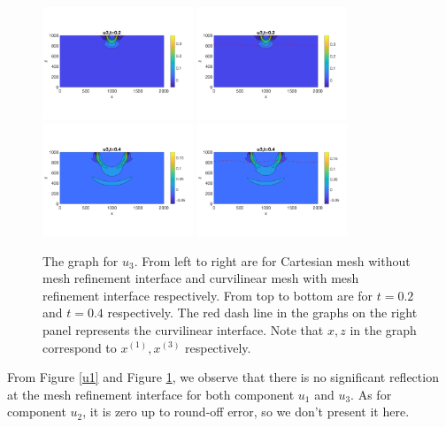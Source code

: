 
\begin{figure}[htbp]
	\centering
	\includegraphics[width=0.4\textwidth,trim={0 2.8cm 0 2.8cm}, clip]{u3_t02_cartesian.png}
	\includegraphics[width=0.4\textwidth,trim={0 2.8cm 0 2.8cm}, clip]{u3_t02_curvi_mr.png}\\
	\includegraphics[width=0.4\textwidth,trim={0 2.8cm 0 2.8cm}, clip]{u3_t04_cartesian.png}
	\includegraphics[width=0.4\textwidth,trim={0 2.8cm 0 2.8cm}, clip]{u3_t04_curvi_mr.png}
	\caption{The graph for $u_3$. From left to right are for Cartesian mesh without mesh refinement interface and curvilinear mesh with mesh refinement interface respectively. From top to bottom are for $t = 0.2$ and $t = 0.4$ respectively. The red dash line in the graphs on the right panel represents the curvilinear interface. Note that $x,z$ in the graph correspond to $x^{(1)}, x^{(3)}$ respectively.}\label{u3}
\end{figure}
From Figure \ref{u1} and Figure \ref{u3}, we observe that there is no significant reflection at the mesh refinement interface for both component $u_1$ and $u_3$. As for component $u_2$, it is zero up to round-off error, so we don't present it here.